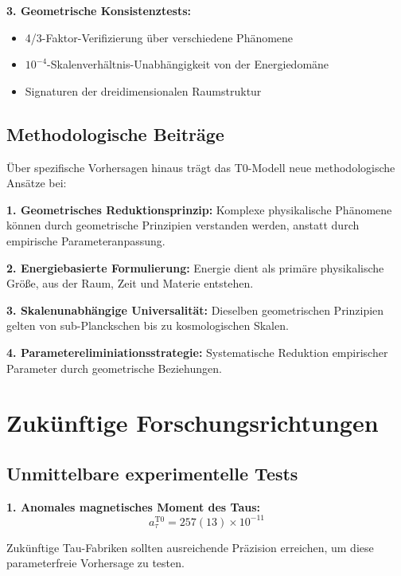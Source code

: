 \documentclass[12pt,a4paper]{report}
\begin{document}
	\textbf{3. Geometrische Konsistenztests:}
	\begin{itemize}
		\item 4/3-Faktor-Verifizierung über verschiedene Phänomene
		\item $10^{-4}$-Skalenverhältnis-Unabhängigkeit von der Energiedomäne
		\item Signaturen der dreidimensionalen Raumstruktur
	\end{itemize}
	
	\subsection{Methodologische Beiträge}
	\label{subsec:methodological_contributions}
	
	Über spezifische Vorhersagen hinaus trägt das T0-Modell neue methodologische Ansätze bei:
	
	\textbf{1. Geometrisches Reduktionsprinzip:}
	Komplexe physikalische Phänomene können durch geometrische Prinzipien verstanden werden, anstatt durch empirische Parameteranpassung.
	
	\textbf{2. Energiebasierte Formulierung:}
	Energie dient als primäre physikalische Größe, aus der Raum, Zeit und Materie entstehen.
	
	\textbf{3. Skalenunabhängige Universalität:}
	Dieselben geometrischen Prinzipien gelten von sub-Planckschen bis zu kosmologischen Skalen.
	
	\textbf{4. Parametereliminiationsstrategie:}
	Systematische Reduktion empirischer Parameter durch geometrische Beziehungen.
	
	\section{Zukünftige Forschungsrichtungen}
	\label{sec:future_research_directions}
	
	\subsection{Unmittelbare experimentelle Tests}
	\label{subsec:immediate_tests}
	
	\textbf{1. Anomales magnetisches Moment des Taus:}
	\begin{equation}
		a_\tau^{\text{T0}} = 257(13) \times 10^{-11}
	\end{equation}
	
	Zukünftige Tau-Fabriken sollten ausreichende Präzision erreichen, um diese parameterfreie Vorhersage zu testen.
	
\end{document}
